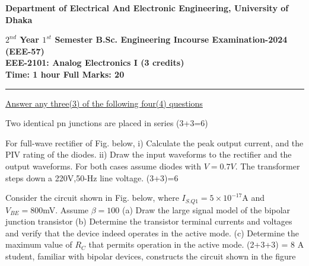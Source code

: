 \documentclass[a4paper,11pt]{exam}
\begin{document}
\begin{center}
    \begin{large}
        {\textbf{
            Department of Electrical And Electronic Engineering, University of Dhaka \\
        }}
    \end{large}
    \textbf{$2^{nd}$ Year $1^{st}$ Semester B.Sc. Engineering Incourse Examination-2024 (EEE-57) \\
        EEE-2101: Analog Electronics I (3 credits) \\
        Time: 1 hour \hfill Full Marks: 20}
    \noindent\rule{\linewidth}{1.2pt}
\end{center}
\underline{Answer any three(3) of the following four(4) questions} 
\begin{questions}
    \question Two identical pn junctions are placed in series \hfill (3+3=6)
    \question For full-wave rectifier of Fig. below, i) Calculate the peak output current, and the PIV rating of the diodes. ii) Draw the input waveforms to the rectifier and the output waveforms. For both cases assume  diodes with $V = 0.7V$. The transformer steps down a 220V,50-Hz line voltage. \hfill (3+3)=6

    \question Consider the circuit shown in Fig. below, where $I_{S.Q1} = 5\times 10^{-17}$A and $V_{BE} = 800$mV. Assume $\beta = 100$ (a) Draw the large signal model of the bipolar junction transistor (b) Determine the transistor terminal currents and voltages and verify that the device indeed operates in the active mode. (c) Determine the maximum value of $R_C$ that permits operation in the active mode. \hfill (2+3+3) = 8
    \question A student, familiar with bipolar devices, constructs the circuit shown in the figure 
\end{questions}
\end{document}
